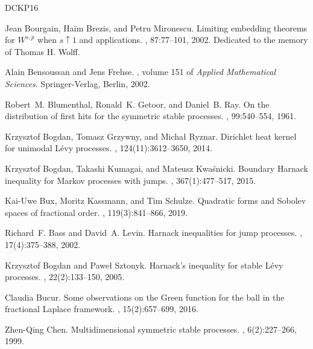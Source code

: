 \documentclass[reqno]{amsart}
\theoremstyle{plain}
\theoremstyle{definition}
\numberwithin{equation}{section}
\begin{document}
\begin{thebibliography}{DCKP16}
	
	Jean Bourgain, Ha\"im Brezis, and Petru Mironescu.
	\newblock Limiting embedding theorems for {$W^{s,p}$} when {$s\uparrow1$} and
	applications.
	, 87:77--101, 2002.
	\newblock Dedicated to the memory of Thomas H. Wolff.
	
	Alain Bensoussan and Jens Frehse.
	, volume 151 of {\em Applied Mathematical Sciences}.
	\newblock Springer-Verlag, Berlin, 2002.
	
	Robert~M. Blumenthal, Ronald~K. Getoor, and Daniel~B. Ray.
	\newblock On the distribution of first hits for the symmetric stable processes.
	, 99:540--554, 1961.
	
	Krzysztof Bogdan, Tomasz Grzywny, and Micha{\l} Ryznar.
	\newblock Dirichlet heat kernel for unimodal {L}\'{e}vy processes.
	, 124(11):3612--3650, 2014.
	
	Krzysztof Bogdan, Takashi Kumagai, and Mateusz Kwa\'{s}nicki.
	\newblock Boundary {H}arnack inequality for {M}arkov processes with jumps.
	, 367(1):477--517, 2015.
	
	Kai-Uwe Bux, Moritz Kassmann, and Tim Schulze.
	\newblock Quadratic forms and {S}obolev spaces of fractional order.
	, 119(3):841--866, 2019.
	
	Richard~F. Bass and David~A. Levin.
	\newblock Harnack inequalities for jump processes.
	, 17(4):375--388, 2002.
	
	Krzysztof Bogdan and Pawe{\l} Sztonyk.
	\newblock Harnack's inequality for stable {L}\'{e}vy processes.
	, 22(2):133--150, 2005.
	
	Claudia Bucur.
	\newblock Some observations on the {G}reen function for the ball in the
	fractional {L}aplace framework.
	, 15(2):657--699, 2016.
	
	Zhen-Qing Chen.
	\newblock Multidimensional symmetric stable processes.
	, 6(2):227--266, 1999.


\end{thebibliography}
\end{document}

